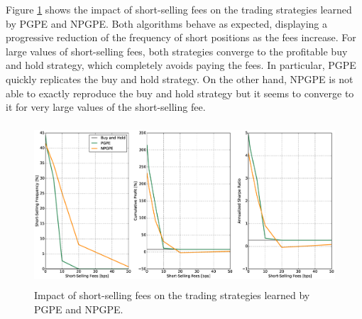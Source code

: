 Figure \ref{fig:impact_short_selling_fees} shows the impact of short-selling fees on the trading strategies learned by \gls{PGPE} and \gls{NPGPE}. Both algorithms behave as expected, displaying a progressive reduction of the frequency of short positions as the fees increase. For large values of short-selling fees, both strategies converge to the profitable buy and hold strategy, which completely avoids paying the fees. In particular, \gls{PGPE} quickly replicates the buy and hold strategy. On the other hand, \gls{NPGPE} is not able to exactly reproduce the buy and hold strategy but it seems to converge to it for very large values of the short-selling fee. 
\begin{figure}[t!]
	\centering
	\includegraphics[height=6cm,width=1.0\textwidth]{Images/6_3_impact_short_selling_fees}
	\caption[Short-selling fees and risk-neutral strategies]{Impact of short-selling fees on the trading strategies learned by PGPE and NPGPE.}
	\label{fig:impact_short_selling_fees}
\end{figure}

